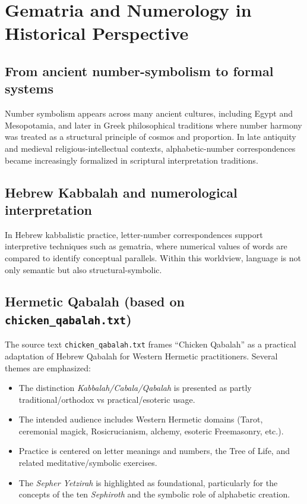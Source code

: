 \documentclass[11pt,a4paper]{report}
\begin{document}
\chapter{Gematria and Numerology in Historical Perspective}
\section{From ancient number-symbolism to formal systems}
Number symbolism appears across many ancient cultures, including Egypt and Mesopotamia, and later in Greek philosophical traditions where number harmony was treated as a structural principle of cosmos and proportion. In late antiquity and medieval religious-intellectual contexts, alphabetic-number correspondences became increasingly formalized in scriptural interpretation traditions.

\section{Hebrew Kabbalah and numerological interpretation}
In Hebrew kabbalistic practice, letter-number correspondences support interpretive techniques such as gematria, where numerical values of words are compared to identify conceptual parallels. Within this worldview, language is not only semantic but also structural-symbolic.

\section{Hermetic Qabalah (based on \texttt{chicken\_qabalah.txt})}
The source text \texttt{chicken\_qabalah.txt} frames ``Chicken Qabalah'' as a practical adaptation of Hebrew Qabalah for Western Hermetic practitioners. Several themes are emphasized:
\begin{itemize}
  \item The distinction \textit{Kabbalah/Cabala/Qabalah} is presented as partly traditional/orthodox vs practical/esoteric usage.
  \item The intended audience includes Western Hermetic domains (Tarot, ceremonial magick, Rosicrucianism, alchemy, esoteric Freemasonry, etc.).
  \item Practice is centered on letter meanings and numbers, the Tree of Life, and related meditative/symbolic exercises.
  \item The \textit{Sepher Yetzirah} is highlighted as foundational, particularly for the concepts of the ten \textit{Sephiroth} and the symbolic role of alphabetic creation.
\end{itemize}
\end{document}
